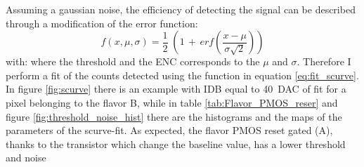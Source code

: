         Assuming a gaussian noise, the efficiency of detecting the signal can be described through a modification of the error function:
        \begin{equation}
            f(x, \mu, \sigma) = \frac{1}{2} \; \left(1\,+\,erf\left(\frac{x-\mu}{\sigma \sqrt{2}}\right)\right)
            \label{eq:fit_scurve}
        \end{equation}
        with: 
        where the threshold and the ENC corresponds to the $\mu$ and $\sigma$.
        Therefore I perform a fit of the counts detected using the function in equation \ref{eq:fit_scurve}. In figure \ref{fig:scurve} there is an example with IDB equal to \SI{40}{DAC} of fit for a pixel belonging to the flavor B, while in table \ref{tab:Flavor_PMOS_reser} and figure \ref{fig:threshold_noise_hist} there are the histograms and the maps of the parameters of the scurve-fit. As expected, the flavor PMOS reset gated (A), thanks to the transistor which change the baseline value, has a lower threshold and noise
